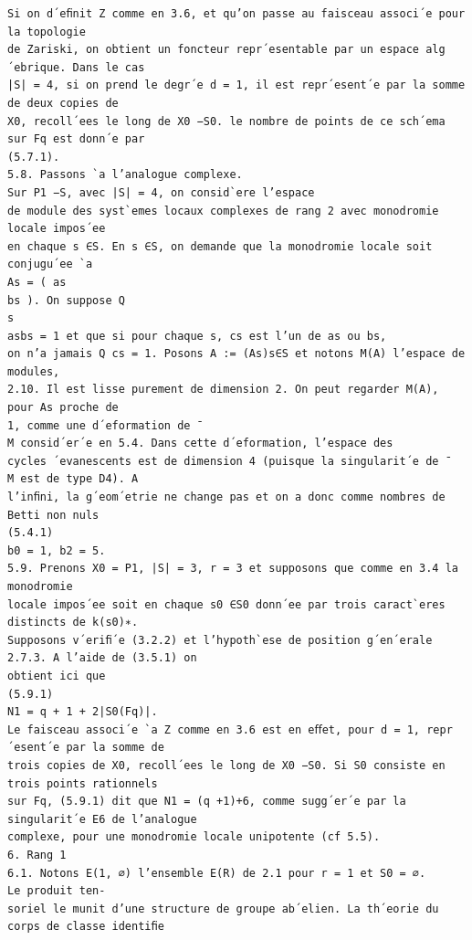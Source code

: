 \documentclass[11pt]{article}
\begin{document}
\begin{Verbatim}[breaklines=true,fontsize=\small]
Si on d´eﬁnit Z comme en 3.6, et qu’on passe au faisceau associ´e pour la topologie
de Zariski, on obtient un foncteur repr´esentable par un espace alg´ebrique. Dans le cas
|S| = 4, si on prend le degr´e d = 1, il est repr´esent´e par la somme de deux copies de
X0, recoll´ees le long de X0 −S0. le nombre de points de ce sch´ema sur Fq est donn´e par
(5.7.1).
5.8. Passons `a l’analogue complexe.
Sur P1 −S, avec |S| = 4, on consid`ere l’espace
de module des syst`emes locaux complexes de rang 2 avec monodromie locale impos´ee
en chaque s ∈S. En s ∈S, on demande que la monodromie locale soit conjugu´ee `a
As = ( as
bs ). On suppose Q
s
asbs = 1 et que si pour chaque s, cs est l’un de as ou bs,
on n’a jamais Q cs = 1. Posons A := (As)s∈S et notons M(A) l’espace de modules,
2.10. Il est lisse purement de dimension 2. On peut regarder M(A), pour As proche de
1, comme une d´eformation de ¯
M consid´er´e en 5.4. Dans cette d´eformation, l’espace des
cycles ´evanescents est de dimension 4 (puisque la singularit´e de ¯
M est de type D4). A
l’inﬁni, la g´eom´etrie ne change pas et on a donc comme nombres de Betti non nuls
(5.4.1)
b0 = 1, b2 = 5.
5.9. Prenons X0 = P1, |S| = 3, r = 3 et supposons que comme en 3.4 la monodromie
locale impos´ee soit en chaque s0 ∈S0 donn´ee par trois caract`eres distincts de k(s0)∗.
Supposons v´eriﬁ´e (3.2.2) et l’hypoth`ese de position g´en´erale 2.7.3. A l’aide de (3.5.1) on
obtient ici que
(5.9.1)
N1 = q + 1 + 2|S0(Fq)|.
Le faisceau associ´e `a Z comme en 3.6 est en eﬀet, pour d = 1, repr´esent´e par la somme de
trois copies de X0, recoll´ees le long de X0 −S0. Si S0 consiste en trois points rationnels
sur Fq, (5.9.1) dit que N1 = (q +1)+6, comme sugg´er´e par la singularit´e E6 de l’analogue
complexe, pour une monodromie locale unipotente (cf 5.5).
6. Rang 1
6.1. Notons E(1, ∅) l’ensemble E(R) de 2.1 pour r = 1 et S0 = ∅.
Le produit ten-
soriel le munit d’une structure de groupe ab´elien. La th´eorie du corps de classe identiﬁe


\end{Verbatim}
\end{document}
